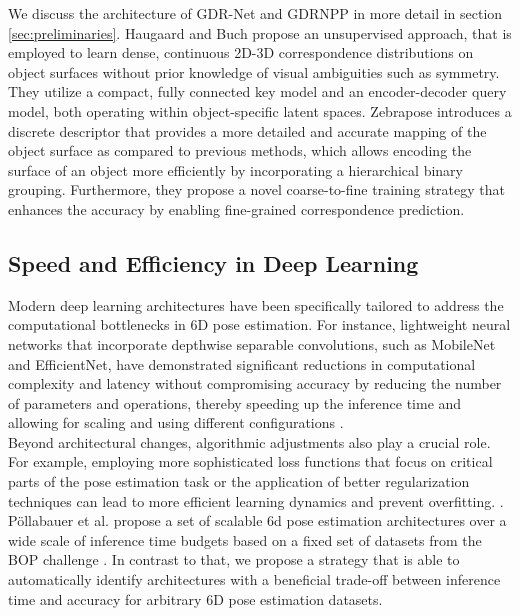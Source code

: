 We discuss the architecture of GDR-Net and GDRNPP in more detail in section \ref{sec:preliminaries}.
Haugaard and Buch \cite{haugaard2022surfemb} propose an unsupervised approach, that is employed to learn dense, continuous 2D-3D correspondence distributions on object surfaces without prior knowledge of visual ambiguities such as symmetry. They utilize a compact, fully connected key model and an encoder-decoder query model, both operating within object-specific latent spaces.
Zebrapose \cite{su2022zebrapose} introduces a discrete descriptor that provides a more detailed and accurate mapping of the object surface as compared to previous methods, which allows encoding the surface of an object more efficiently by incorporating a hierarchical binary grouping. Furthermore, they propose a novel coarse-to-fine training strategy that enhances the accuracy by enabling fine-grained correspondence prediction.


\subsection{Speed and Efficiency in Deep Learning}
Modern deep learning architectures have been specifically tailored to address the computational bottlenecks in 6D pose estimation. For instance, lightweight neural networks that incorporate depthwise separable convolutions, such as MobileNet and EfficientNet, have demonstrated significant reductions in computational complexity and latency without compromising accuracy by reducing the number of parameters and operations, thereby speeding up the inference time and allowing for scaling and using different configurations \cite{liang2021efficient, wang2024lightweight,}.\\
Beyond architectural changes, algorithmic adjustments also play a crucial role. For example, employing more sophisticated loss functions that focus on critical parts of the pose estimation task or the application of better regularization techniques can lead to more efficient learning dynamics and prevent overfitting. \cite{liu2023linear, gonzalez2020effective}.\\
Pöllabauer et al. \cite{pollabauer2024fast} propose a set of scalable 6d pose estimation architectures over a wide scale of inference time budgets based on a fixed set of datasets from the BOP challenge \cite{BOPBenchmark6Da}. In contrast to that, we propose a strategy that is able to automatically identify architectures with a beneficial trade-off between inference time and accuracy for arbitrary 6D pose estimation datasets.